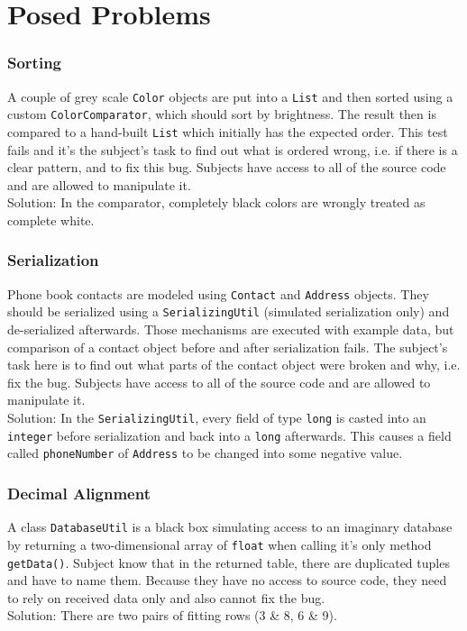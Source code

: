 \documentclass[english]{acm_proc_article-sp}
\begin{document}
\section{Posed Problems}
\subsubsection{Sorting}
A couple of grey scale \verb.Color. objects are put into a \verb.List. and then sorted using a custom \verb.ColorComparator., which should sort by brightness. The result then is compared to a hand-built \verb.List. which initially has the expected order. This test fails and it's the subject's task to find out what is ordered wrong, i.e. if there is a clear pattern, and to fix this bug. Subjects have access to all of the source code and are allowed to manipulate it.\\
Solution: In the comparator, completely black colors are wrongly treated as complete white.

\subsubsection{Serialization}
Phone book contacts are modeled using \verb.Contact. and \verb.Address. objects. They should be serialized using a \verb.SerializingUtil. (simulated serialization only) and de-serialized afterwards.
Those mechanisms are executed with example data, but comparison of a contact object before and after serialization fails. The subject's task here is to find out what parts of the contact object were broken and why, i.e. fix the bug. Subjects have access to all of the source code and are allowed to manipulate it.\\
Solution: In the \verb.SerializingUtil., every field of type \verb.long. is casted into an \verb.integer. before serialization and back into a \verb.long. afterwards. This causes a field called \verb.phoneNumber. of \verb.Address. to be changed into some negative value.

\subsubsection{Decimal Alignment}
A class \verb.DatabaseUtil. is a black box simulating access to an imaginary database by returning a two-dimensional array of \verb.float. when calling it's only method \verb.getData().. Subject know that in the returned table, there are duplicated tuples and have to name them. Because they have no access to source code, they need to rely on received data only and also cannot fix the bug.\\
Solution: There are two pairs of fitting rows (3 \& 8, 6 \& 9).
\end{document}
